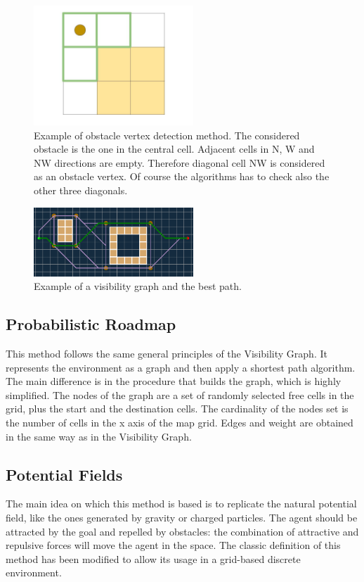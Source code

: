 \documentclass[conference]{IEEEtran}
\begin{document}
\begin{figure}[]
	\includegraphics[width=6cm]{obstaclevertex.jpg}
	\centering
	\caption{Example of obstacle vertex detection method. The considered obstacle is the one in the central cell. Adjacent cells in N, W and NW directions are empty. Therefore diagonal cell NW is considered as an obstacle vertex. Of course the algorithms has to check also the other three diagonals.}
	\label{fig:obstaclevertex}
\end{figure}

\begin{figure}[]
	\includegraphics[width=6cm]{visibilityexample.png}
	\centering
	\caption{Example of a visibility graph and the best path.}
	\label{fig:visibilityexample}
\end{figure}

\subsection{Probabilistic Roadmap}
This method follows the same general principles of the Visibility Graph. It represents the environment as a graph and then apply a shortest path algorithm. The main difference is in the procedure that builds the graph, which is highly simplified. The nodes of the graph are a set of randomly selected free cells in the grid, plus the start and the destination cells. The cardinality of the nodes set is the number of cells in the x axis of the map grid. Edges and weight are obtained in the same way as in the Visibility Graph.

\subsection{Potential Fields}
The main idea on which this method is based is to replicate the natural potential field, like the ones generated by gravity or charged particles. The agent should be attracted by the goal and repelled by obstacles: the combination of attractive and repulsive forces will move the agent in the space. The classic definition of this method has been modified to allow its usage in a grid-based discrete environment.
\end{document}
